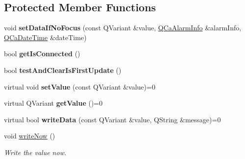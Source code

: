 \subsection*{Protected Member Functions}
\begin{DoxyCompactItemize}
\item 
\hypertarget{classQEGenericEdit_ad02189df7183d90a526c3f3d5ac0b6ae}{
void {\bfseries setDataIfNoFocus} (const QVariant \&value, \hyperlink{classQCaAlarmInfo}{QCaAlarmInfo} \&alarmInfo, \hyperlink{classQCaDateTime}{QCaDateTime} \&dateTime)}
\label{classQEGenericEdit_ad02189df7183d90a526c3f3d5ac0b6ae}

\item 
\hypertarget{classQEGenericEdit_a6fa0a363dd4854ea0eb798fd25cd1b73}{
bool {\bfseries getIsConnected} ()}
\label{classQEGenericEdit_a6fa0a363dd4854ea0eb798fd25cd1b73}

\item 
\hypertarget{classQEGenericEdit_ab34598025968f64b8f7076d2d863b569}{
bool {\bfseries testAndClearIsFirstUpdate} ()}
\label{classQEGenericEdit_ab34598025968f64b8f7076d2d863b569}

\item 
\hypertarget{classQEGenericEdit_ad48cf45ad365708c88d421aab99c5c4d}{
virtual void {\bfseries setValue} (const QVariant \&value)=0}
\label{classQEGenericEdit_ad48cf45ad365708c88d421aab99c5c4d}

\item 
\hypertarget{classQEGenericEdit_ae31c252612988eec9a3161b759c1beaf}{
virtual QVariant {\bfseries getValue} ()=0}
\label{classQEGenericEdit_ae31c252612988eec9a3161b759c1beaf}

\item 
\hypertarget{classQEGenericEdit_a38e8a142c71a0527aeea7d44f9cf59c2}{
virtual bool {\bfseries writeData} (const QVariant \&value, QString \&message)=0}
\label{classQEGenericEdit_a38e8a142c71a0527aeea7d44f9cf59c2}

\item 
\hypertarget{classQEGenericEdit_a22c63f981233ad42124d10eef6b7af3b}{
void \hyperlink{classQEGenericEdit_a22c63f981233ad42124d10eef6b7af3b}{writeNow} ()}
\label{classQEGenericEdit_a22c63f981233ad42124d10eef6b7af3b}

\begin{DoxyCompactList}\small\item\em Write the value now. \end{DoxyCompactList}\end{DoxyCompactItemize}
